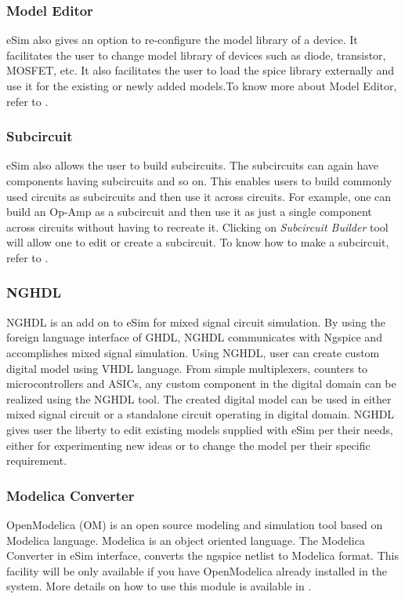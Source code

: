 \subsubsection {Model Editor}
eSim also gives an option to re-configure the model library of a
device. It facilitates the user to change model library of devices
such as diode, transistor, MOSFET, etc. It also facilitates the user to load the spice library externally and use it for the existing or newly added models.To know
more about Model Editor, refer to .

\subsubsection {Subcircuit}
eSim also allows the user to build subcircuits. The subcircuits can
again have components having subcircuits and so on. This enables users
to build commonly used circuits as subcircuits and then use it across
circuits. For example, one can build an Op-Amp as a
subcircuit and then use it as just a single component across circuits
without having to recreate it. Clicking on \textit{Subcircuit
Builder} tool will allow one to edit or create a subcircuit. To know
how to make a subcircuit, refer to .

\subsubsection {NGHDL}
NGHDL is an add on to eSim for mixed signal circuit simulation. By using the foreign language interface of GHDL, NGHDL communicates with Ngspice and accomplishes mixed signal simulation. Using NGHDL, user can create custom digital model using VHDL language. From simple multiplexers, counters to microcontrollers and ASICs, any custom component in the digital domain can be realized using the NGHDL tool. The created digital model can be used in either mixed signal circuit or a standalone circuit operating in digital domain. NGHDL gives user the liberty to edit existing models supplied with eSim per their needs, either for experimenting new ideas or to change the model per their specific requirement.

\subsubsection {Modelica Converter}
OpenModelica (OM) is an open source modeling and simulation tool based on
Modelica language. Modelica is an object oriented language. The Modelica Converter in eSim interface, converts the ngspice netlist to Modelica format. This facility will be only available if you have OpenModelica already installed in the system. More details on how to use this module is available in .

